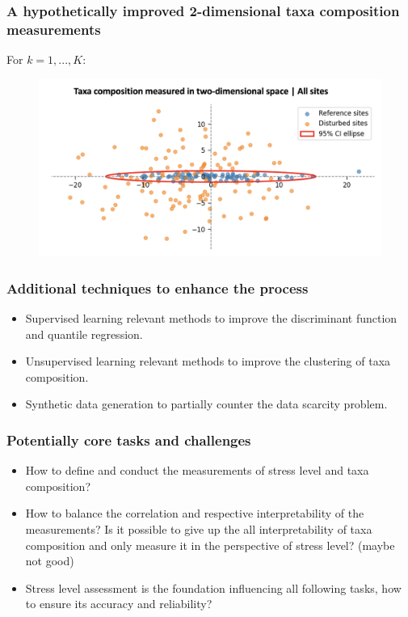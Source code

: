 \documentclass{beamer}
\begin{document}
\begin{frame}
\frametitle{A hypothetically improved 2-dimensional taxa composition measurements}
For \(k = 1, ..., K\):
\begin{figure}
    \centering
    \includegraphics[width=\textwidth]{figures/p19_improved_2dimensional_measurements.png}
\end{figure}

\end{frame}

\begin{frame}
\frametitle{Additional techniques to enhance the process}

\begin{itemize}
    \item Supervised learning relevant methods to improve the discriminant function and quantile regression.
    \item Unsupervised learning relevant methods to improve the clustering of taxa composition.
    \item Synthetic data generation to partially counter the data scarcity problem.
\end{itemize}

\end{frame}

\begin{frame}
\frametitle{Potentially core tasks and challenges}

\begin{itemize}
    \item How to define and conduct the measurements of stress level and taxa composition?
    \item How to balance the correlation and respective interpretability of the 
    measurements? Is it possible to give up the all interpretability of taxa composition and 
    only measure it in the perspective of stress level? (maybe not good)
    \item Stress level assessment is the foundation influencing all following tasks,
    how to ensure its accuracy and reliability?
\end{itemize}

\end{frame}
\end{document}
